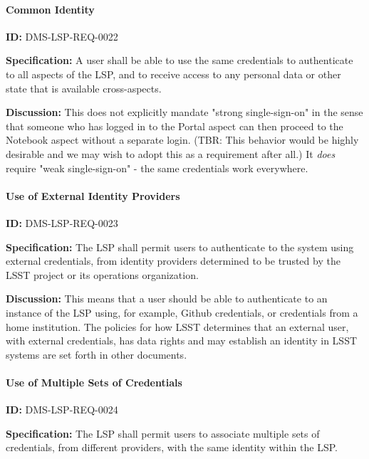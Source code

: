 \documentclass[SE,toc]{lsstdoc}
\begin{document}
\paragraph{Common Identity}\hfill  %

\label{DMS-LSP-REQ-0022}
\textbf{ID:} DMS-LSP-REQ-0022

\textbf{Specification:}
A user shall be able to use the same credentials to authenticate to all aspects of the LSP, and to receive access to any personal data or other state that is available cross-aspects.

\textbf{Discussion:}
This does not explicitly mandate "strong single-sign-on" in the sense that someone who has logged in to the Portal aspect can then proceed to the Notebook aspect without a separate login. (TBR: This behavior would be highly desirable and we may wish to adopt this as a requirement after all.) It \textit{does} require "weak single-sign-on" - the same credentials work everywhere.

\paragraph{Use of External Identity Providers}\hfill  %

\label{DMS-LSP-REQ-0023}
\textbf{ID:} DMS-LSP-REQ-0023

\textbf{Specification:}
The LSP shall permit users to authenticate to the system using external credentials, from identity providers determined to be trusted by the LSST project or its operations organization.

\textbf{Discussion:}
This means that a user should be able to authenticate to an instance of the LSP using, for example, Github credentials, or credentials from a home institution.
The policies for how LSST determines that an external user, with external credentials, has data rights and may establish an identity in LSST systems are set forth in other documents.

\paragraph{Use of Multiple Sets of Credentials}\hfill  %

\label{DMS-LSP-REQ-0024}
\textbf{ID:} DMS-LSP-REQ-0024

\textbf{Specification:}
The LSP shall permit users to associate multiple sets of credentials, from different providers, with the same identity within the LSP.
\end{document}
